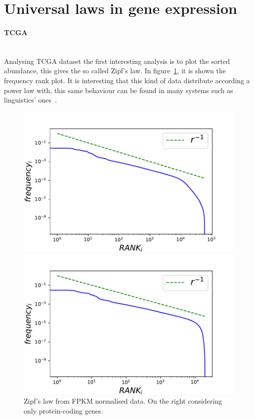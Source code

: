 \section{Universal laws in gene expression}\label{sec:universallaws}
\paragraph{TCGA}\mbox{} \\
Analysing TCGA dataset the first interesting analysis is to plot the sorted abundance, this gives the so called Zipf's law.
In figure~\ref{fig:structure/tcga/globalZipf}, it is shown the frequency rank plot. It is interesting that this kind of data distribute according a power law with, this same behaviour can be found in many systems such as linguistics' ones~\cite{altmann2016statistical}.
\begin{figure}[htb!]
	\centering
	\begin{minipage}{0.45\textwidth}
		\includegraphics[width=0.95\linewidth]{pictures/structure/tcga/globalzipf_fpkmall.pdf}
	\end{minipage}
	\hspace{3mm}
	\begin{minipage}{0.45\textwidth}
		\includegraphics[width=0.95\linewidth]{pictures/structure/tcga/globalzipf_fpkm.pdf}
	\end{minipage}
	\caption{Zipf's law from FPKM normalised data. On the right considering only protein-coding genes.}
	\label{fig:structure/tcga/globalZipf}
\end{figure}
